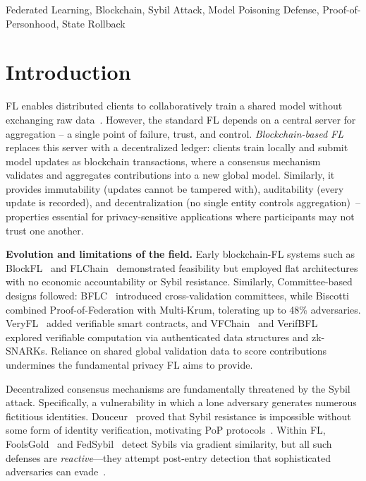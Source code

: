\documentclass[conference]{IEEEtran}
\begin{document}
\begin{IEEEkeywords}
Federated Learning, Blockchain, Sybil Attack, Model Poisoning Defense, Proof-of-Personhood, State Rollback
\end{IEEEkeywords}

\section{Introduction}

FL enables distributed clients to collaboratively train a shared model without exchanging raw data~\cite{li2020blockchain, kim2020ondevice}. However, the standard FL depends on a central server for aggregation -- a single point of failure, trust, and control. \emph{Blockchain-based FL} replaces this server with a decentralized ledger: clients train locally and submit model updates as blockchain transactions, where a consensus mechanism validates and aggregates contributions into a new global model. Similarly, it provides immutability (updates cannot be tampered with), auditability (every update is recorded), and decentralization (no single entity controls aggregation)~\cite{jiang2024bfl, li2022bflsurvey}--properties essential for privacy-sensitive applications where participants may not trust one another.

\textbf{Evolution and limitations of the field.} Early blockchain-FL systems such as BlockFL~\cite{kim2019blockfl} and FLChain~\cite{liu2020flchain} demonstrated feasibility but employed flat architectures with no economic accountability or Sybil resistance. Similarly, Committee-based designs followed: BFLC~\cite{li2020blockchain} introduced cross-validation committees, while Biscotti~\cite{shayan2021biscotti} combined Proof-of-Federation with Multi-Krum, tolerating up to 48\% adversaries. VeryFL~\cite{li2025veryfl} added verifiable smart contracts, and VFChain~\cite{peng2022vfchain} and VerifBFL~\cite{bellachia2025verifbfl} explored verifiable computation via authenticated data structures and zk-SNARKs. Reliance on shared global validation data to score contributions undermines the fundamental privacy FL aims to provide.

Decentralized consensus mechanisms are fundamentally threatened by the Sybil attack. Specifically, a vulnerability in which a lone adversary generates numerous fictitious identities. Douceur~\cite{douceur2002sybil} proved that Sybil resistance is impossible without some form of identity verification, motivating PoP protocols~\cite{borge2017pop, siddarth2020pop, adler2024phc}. Within FL, FoolsGold~\cite{fung2020foolsgold} and FedSybil~\cite{samy2023fedsybil} detect Sybils via gradient similarity, but all such defenses are \emph{reactive}---they attempt post-entry detection that sophisticated adversaries can evade~\cite{fang2020local}.
\end{document}
